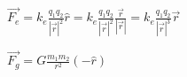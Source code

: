 \documentclass{article}
\begin{document}
$\vec{F_e} = k_e\frac{q_1q_2}{|\vec{r}|^2}\hat{r} = 
		k_e\frac{q_1q_2}{|\vec{r}|^2}\frac{\vec{r}}{|\vec{r}|}=
		k_e\frac{q_1q_2}{|\vec{r}|^3}\vec{r}$

$\vec{F_g} = G\frac{m_1m_2}{r^2}(-\hat{r})$
\end{document}
